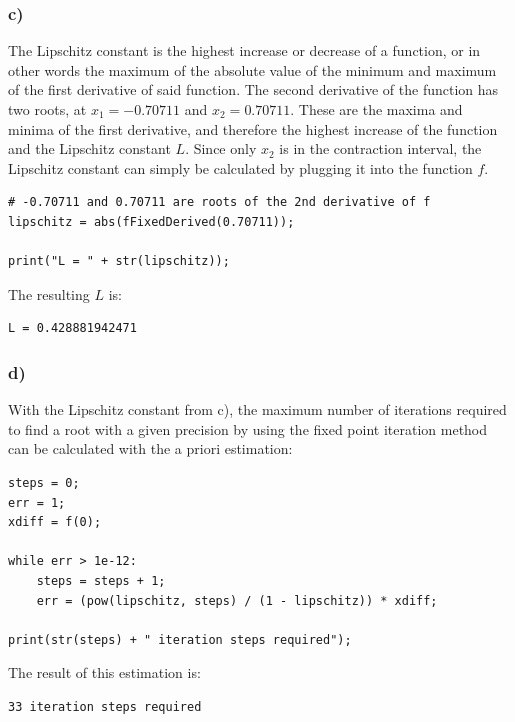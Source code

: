 \subsubsection{c)}

The Lipschitz constant is the highest increase or decrease of a function, or in other words the maximum of the absolute value of the minimum and maximum of the first derivative of said function.
The second derivative of the function has two roots, at $x_1 = -0.70711$ and $x_2 = 0.70711$. These are the maxima and minima of the first derivative, and therefore the highest increase of the function and the Lipschitz constant $L$. Since only $x_2$ is in the contraction interval, the Lipschitz constant can simply be calculated by plugging it into the function $f$.

\begin{lstlisting}[caption=Problem 4.8 c)]
# -0.70711 and 0.70711 are roots of the 2nd derivative of f
lipschitz = abs(fFixedDerived(0.70711));

print("L = " + str(lipschitz));
\end{lstlisting}

The resulting $L$ is:

\begin{lstlisting}[caption=Result of 4.8 c), keywordstyle=\color{black}]
L = 0.428881942471
\end{lstlisting}

\subsubsection{d)}

With the Lipschitz constant from c), the maximum number of iterations required to find a root with a given precision by using the fixed point iteration method can be calculated with the a priori estimation:

\begin{lstlisting}[caption=Problem 4.8 d)]
steps = 0;
err = 1;
xdiff = f(0);

while err > 1e-12:
	steps = steps + 1;
	err = (pow(lipschitz, steps) / (1 - lipschitz)) * xdiff;

print(str(steps) + " iteration steps required");
\end{lstlisting}

The result of this estimation is:

\begin{lstlisting}[caption=Result of 4.8 d), keywordstyle=\color{black}]
33 iteration steps required
\end{lstlisting}

